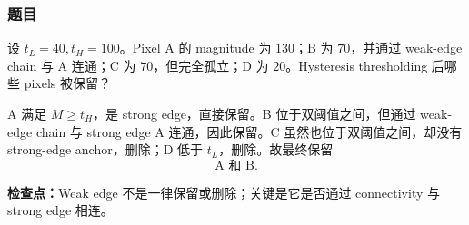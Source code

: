 \subsubsection*{题目}

设 $t_L=40,t_H=100$。Pixel A 的 magnitude 为 $130$；B 为 $70$，并通过 weak-edge chain 与 A 连通；C 为 $70$，但完全孤立；D 为 $20$。Hysteresis thresholding 后哪些 pixels 被保留？

\begin{checkedsolution}
A 满足 $M\ge t_H$，是 strong edge，直接保留。B 位于双阈值之间，但通过 weak-edge chain 与 strong edge A 连通，因此保留。C 虽然也位于双阈值之间，却没有 strong-edge anchor，删除；D 低于 $t_L$，删除。故最终保留
\[
  \boxed{\text{A 和 B}}.
\]
\end{checkedsolution}

\textbf{检查点：}Weak edge 不是一律保留或删除；关键是它是否通过 connectivity 与 strong edge 相连。
